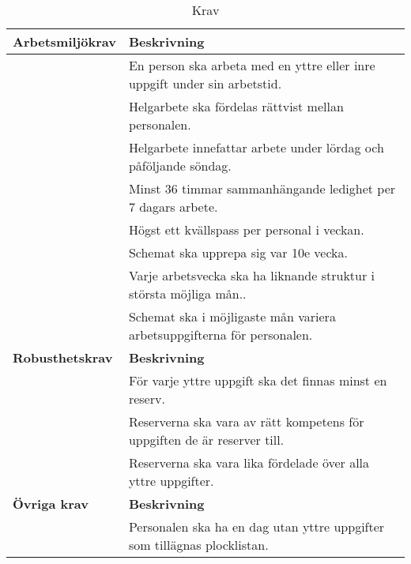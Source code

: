 \begin{table}[H]
\caption{Krav}
\label{int:3}
\begin{tabular}{|l|l|}
\hline
\textbf{Arbetsmiljökrav} & \textbf{Beskrivning} \\ \hline
& En person ska arbeta med en yttre eller inre uppgift under sin arbetstid.
\\ \hline 
 & Helgarbete ska fördelas rättvist mellan personalen. 
\\ \hline 
 & Helgarbete innefattar arbete under lördag och påföljande söndag.
\\ \hline 
 & Minst 36 timmar sammanhängande ledighet per 7 dagars arbete.
\\ \hline 
 & Högst ett kvällspass per personal i veckan.
\\ \hline 
 & Schemat ska upprepa sig var 10e vecka.
\\ \hline 
 & Varje arbetsvecka ska ha liknande struktur i största möjliga mån..
\\ \hline 
 & Schemat ska i möjligaste mån variera arbetsuppgifterna för personalen.
\\ \hline 

\textbf{Robusthetskrav} & \textbf{Beskrivning} \\ \hline
 & För varje yttre uppgift ska det finnas minst en reserv.
\\ \hline 
 & Reserverna ska vara av rätt kompetens för uppgiften de är reserver till.
\\ \hline 
 & Reserverna ska vara lika fördelade över alla yttre uppgifter.
\\ \hline 

\textbf{Övriga krav} & \textbf{Beskrivning} \\ \hline
 & Personalen ska ha en dag utan yttre uppgifter som tillägnas plocklistan.
\\ \hline 
\end{tabular}
\end{table}
\medskip

